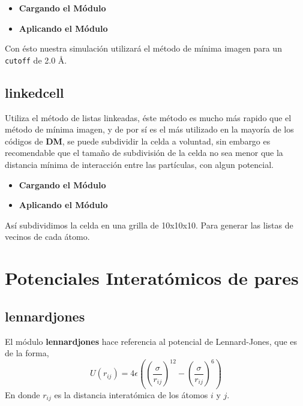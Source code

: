 \begin{itemize}
 \item \textbf{Cargando el M\'odulo}
 \item \textbf{Aplicando el M\'odulo}
\end{itemize}

Con \'esto nuestra simulaci\'on utilizar\'a el m\'etodo de m\'inima imagen para un \verb|cutoff| de 2.0 \AA.

\subsection{linkedcell}
Utiliza el m\'etodo de listas linkeadas, \'este m\'etodo es mucho m\'as rapido que el m\'etodo de m\'inima imagen, y de por s\'i es el m\'as utilizado en la mayor\'ia de los c\'odigos de \textbf{DM}, se puede subdividir la celda a voluntad, sin embargo es recomendable que el tama\~no de subdivisi\'on de la celda no sea menor que la distancia m\'inima de interacci\'on entre las part\'iculas, con algun potencial.

\begin{itemize}
 \item \textbf{Cargando el M\'odulo}
 \item \textbf{Aplicando el M\'odulo}
\end{itemize}

As\'i subdividimos la celda en una grilla de 10x10x10. Para generar las listas de vecinos de cada \'atomo.
\section{Potenciales Interat\'omicos de pares}
\subsection{lennardjones}
El m\'odulo \textbf{lennardjones} hace referencia al potencial de Lennard-Jones, que es de la forma,
$$U(r_{ij}) = 4\epsilon\left(\left(\frac{\sigma}{r_{ij}}\right)^{12}-\left(\frac{\sigma}{r_{ij}}\right)^6\right)$$
En donde $r_{ij}$ es la distancia interat\'omica de los \'atomos $i$ y $j$. 


